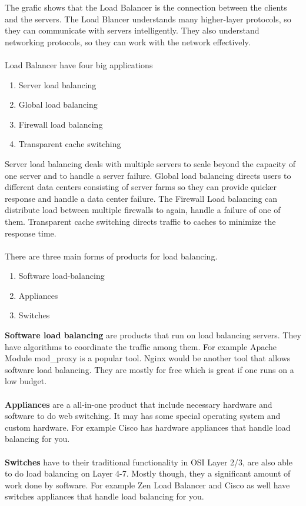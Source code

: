 \documentclass[12p]{article}
\begin{document}
	The grafic shows that the Load Balancer is the connection between the clients and the servers. The Load Blancer understands many higher-layer protocols, so they can communicate with servers intelligently. They also understand networking protocols, so they can work with the network effectively.\\\\
	Load Balancer have four big applications
	\begin{enumerate}
		\item Server load balancing
		\item Global load balancing
		\item Firewall load balancing
		\item Transparent cache switching
	\end{enumerate}
	\newpage 
	Server load balancing deals with multiple servers to scale beyond the capacity of one server and to handle a server failure. Global load balancing directs users to different data centers consisting of server farms so they can provide quicker response and handle a data center failure. The Firewall Load balancing can distribute load between multiple firewalls to again, handle a failure of one of them. Transparent cache switching directs traffic to caches to minimize the response time. \\ \\
	There are three main forms of products for load balancing. 
	\begin{enumerate}
		\item Software load-balancing
		\item Appliances
		\item Switches
	\end{enumerate}
	\textbf{Software load balancing} are products that run on load balancing servers. They have algorithms to coordinate the traffic among them. For example Apache Module mod\_proxy is a popular tool. Nginx would be another tool that allows software load balancing. They are mostly for free which is great if one runs on a low budget.  \\\\ %
	\textbf{Appliances} are a all-in-one product that include necessary hardware and software to do web switching. It may has some special operating system and custom hardware. For example Cisco has hardware appliances that handle load balancing for you. \\\\ %
	\textbf{Switches} have to their traditional functionality in OSI Layer 2/3, are also able to do load balancing on Layer 4-7. Mostly though, they a significant amount of work done by software. For example Zen Load Balancer  and Cisco as well have switches  appliances that handle load balancing for you.
	
\end{document}
